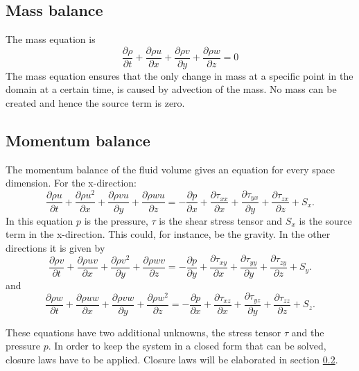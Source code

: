 \documentclass{report}
\newcommand{\dt}[1]{\frac{\partial #1}{\partial t}}
\newcommand{\dx}[1]{\frac{\partial #1}{\partial x}}
\newcommand{\dy}[1]{\frac{\partial #1}{\partial y}}
\newcommand{\dz}[1]{\frac{\partial #1}{\partial z}}
\begin{document}
\subsection{Mass balance}
The mass equation is
\begin{equation}
\label{e:mass_balance}
\dt{\rho} + \dx{\rho u} + \dy{\rho v} + \dz{\rho w} = 0
\end{equation}
The mass equation ensures that the only change in mass at a specific point in the domain at a certain time, is caused by advection of the mass. No mass can be created and hence the source term is zero.

\subsection{Momentum balance}
The momentum balance of the fluid volume gives an equation for every space dimension.
For the x-direction:
\begin{equation}
\label{e:momentumBalance_X}
\dt{\rho u} + \dx{\rho u^2} + \dy{\rho v u} + \dz{\rho w u} =
-\dx{p} + \dx{\tau_{xx}} + \dy{\tau_{yx}} + \dz{\tau_{zx}} + S_x.
\end{equation}
In this equation $p$ is the pressure, $\tau$ is the shear stress tensor and $S_x$ is the source term in the x-direction. This could, for instance, be the gravity.
In the other directions it is given by
\begin{equation}
\label{e:momentumBalance_Y}
\dt{\rho v} + \dx{\rho u v} + \dy{\rho v^2} + \dz{\rho w v} =
-\dy{p} + \dx{\tau_{xy}} + \dy{\tau_{yy}} + \dz{\tau_{zy}} + S_y.
\end{equation}
and
\begin{equation}
\label{e:momentumBalance_Z}
\dt{\rho w} + \dx{\rho u w} + \dy{\rho v w} + \dz{\rho w^2} =
-\dx{p} + \dx{\tau_{xz}} + \dy{\tau_{yz}} + \dz{\tau_{zz}} + S_z.
\end{equation}

These equations have two additional unknowns, the stress tensor $\tau$ and the pressure $p$. In order to keep the system in a closed form that can be solved, closure laws have to be applied. Closure laws will be elaborated in section \ref{}.
\end{document}
